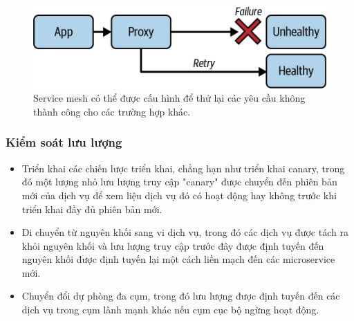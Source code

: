 \documentclass[12pt,a4paper]{report}
\begin{document}
	\hspace{0.3cm}{Giảm thất bại có thể có nghĩa là thực hiện kiểm tra tình trạng để lưu lượng truy cập chỉ được gửi đến các dịch vụ khỏe mạnh. Xử lý lỗi có thể có nghĩa là thử lại các yêu cầu không thành công hoặc triển khai thời gian chờ, vì vậy một dịch vụ không chờ phản hồi mãi mãi.\\}
	
	\hspace{0.3cm}{Việc triển khai các kỹ thuật này trong mã tốn nhiều thời gian, dễ xảy ra lỗi và khó thực hiện một cách nhất quán trên tất cả các dịch vụ của bạn. Với service mesh, proxy có thể thực hiện các kỹ thuật này cho bất kỳ dịch vụ nào của bạn - tất cả những gì bạn cần làm là tương tác với control plane. Bạn cũng có thể điều chỉnh cài đặt theo thời gian thực khi tải dịch vụ thay đổi.\\}
	
	\begin{figure}[h]
		\centering
		\includegraphics[width=0.7\linewidth]{Pics/reliability}
		\caption{\label{fig:reliability} Service mesh có thể được cấu hình để thử lại các yêu cầu không thành công cho các trường hợp khác.}
		\label{fig:reliability}
	\end{figure}
	
	\subsubsection{Kiểm soát lưu lượng}
	\hspace{1cm}{Kiểm soát lưu lượng là về việc kiểm soát nơi lưu lượng giữa các dịch vụ được định tuyến. Kiểm soát lưu lượng giải quyết nhiều vấn đề:}
	
	\begin{itemize}
		\item Triển khai các chiến lược triển khai, chẳng hạn như triển khai canary, trong đó một lượng nhỏ  lưu lượng truy cập "canary" được chuyển đến phiên bản mới của dịch vụ để xem liệu dịch vụ đó có hoạt động hay không trước khi triển khai đầy đủ phiên bản mới.
		\smallskip
		\item Di chuyển từ nguyên khối sang vi dịch vụ, trong đó các dịch vụ được tách ra khỏi nguyên khối và lưu lượng truy cập trước đây được định tuyến đến nguyên khối được định tuyến lại một cách liền mạch đến các microservice mới.
		\smallskip
		\item Chuyển đổi dự phòng đa cụm, trong đó lưu lượng được định tuyến đến các dịch vụ trong cụm lành mạnh khác nếu cụm cục bộ ngừng hoạt động.
	\end{itemize}
\end{document}
